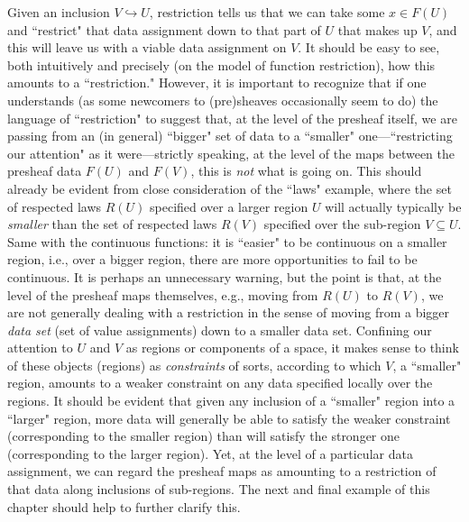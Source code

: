 \documentclass[a4paper]{book}
\theoremstyle{definition}
\theoremstyle{definition}
\theoremstyle{definition}
\theoremstyle{theorem}
\theoremstyle{definition}
\begin{document}
Given an inclusion $V \hookrightarrow U$, restriction tells us that we can take some $x \in F(U)$ and ``restrict" that data assignment down to that part of $U$ that makes up $V$, and this will leave us with a viable data assignment on $V$. It should be easy to see, both intuitively and precisely (on the model of function restriction), how this amounts to a ``restriction." However, it is important to recognize that if one understands (as some newcomers to (pre)sheaves occasionally seem to do) the language of ``restriction" to suggest that, at the level of the presheaf itself, we are passing from an (in general) ``bigger" set of data to a ``smaller" one---``restricting our attention" as it were---strictly speaking, at the level of the maps between the presheaf data $F(U)$ and $F(V)$, this is \textit{not} what is going on. This should already be evident from close consideration of the ``laws" example, where the set of respected laws $R(U)$ specified over a larger region $U$ will actually typically be \textit{smaller} than the set of respected laws $R(V)$ specified over the sub-region $V \subseteq U$. Same with the continuous functions: it is ``easier" to be continuous on a smaller region, i.e., over a bigger region, there are more opportunities to fail to be continuous. It is perhaps an unnecessary warning, but the point is that, at the level of the presheaf maps themselves, e.g., moving from $R(U)$ to $R(V)$, we are not generally dealing with a restriction in the sense of moving from a bigger \textit{data set} (set of value assignments) down to a smaller data set. Confining our attention to $U$ and $V$ as regions or components of a space, it makes sense to think of these objects (regions) as \textit{constraints} of sorts, according to which $V$, a ``smaller" region, amounts to a weaker constraint on any data specified locally over the regions. It should be evident that given any inclusion of a ``smaller" region into a ``larger" region, more data will generally be able to satisfy the weaker constraint (corresponding to the smaller region) than will satisfy the stronger one (corresponding to the larger region). Yet, at the level of a particular data assignment, we can regard the presheaf maps as amounting to a restriction of that data along inclusions of sub-regions. The next and final example of this chapter should help to further clarify this.
\end{document}
